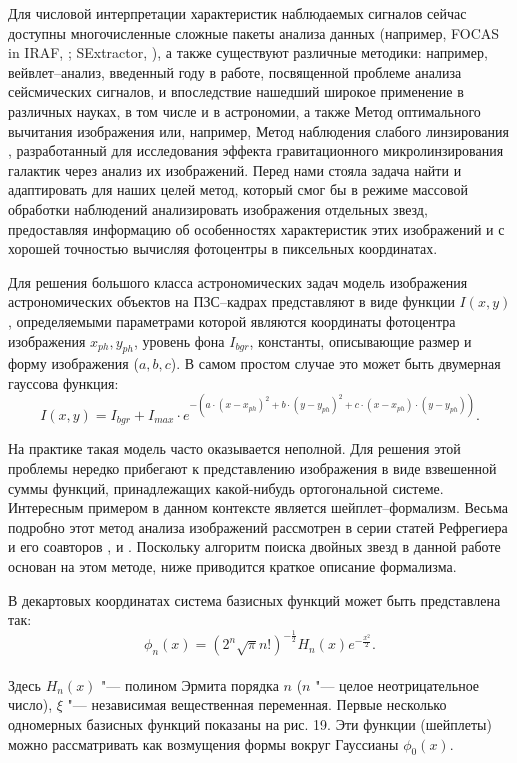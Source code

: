 Для числовой интерпретации характеристик наблюдаемых сигналов сейчас  доступны многочисленные сложные пакеты анализа данных (например,  FOCAS in IRAF, \cite{1981AJ.....86..476J}; SExtractor, \cite{1996A&AS..117...393B}), а также существуют различные методики: например, вейвлет--анализ, введенный  году в работе, посвященной проблеме анализа сейсмических сигналов, и впоследствие нашедший широкое применение в различных науках, в том числе и в астрономии, а также Метод оптимального вычитания изображения \cite{1998ApJ...503..325A}  или, например, Метод наблюдения слабого линзирования \cite{1995ApJ...449..460K}, разработанный для исследования эффекта гравитационного микролинзирования галактик через анализ их изображений. Перед нами стояла задача найти и адаптировать для наших целей метод, который смог бы в режиме массовой обработки наблюдений  анализировать изображения отдельных звезд, предоставляя информацию об особенностях характеристик этих изображений и с хорошей точностью вычисляя фотоцентры в пиксельных координатах.

Для решения большого класса астрономических задач модель изображения астрономических объектов на ПЗС--кадрах представляют в виде функции $I(x,y)$, определяемыми параметрами которой являются координаты фотоцентра изображения $x_{ph},y_{ph}$, уровень фона $I_{bgr}$, константы, описывающие размер и форму изображения ($a,b,c$). В самом простом случае это может быть двумерная гауссова функция:
 \begin{equation}
 \label{eq:ShI}
 I(x,y) = I_{bgr}+I_{max}\cdot e^{-(a\cdot(x-x_{ph})^2+b\cdot(y-y_{ph})^2+c\cdot(x-x_{ph})\cdot(y-y_{ph}))}.
 \end{equation}
 
На практике такая модель часто оказывается неполной. Для решения этой проблемы нередко прибегают к представлению изображения в виде взвешенной суммы функций, принадлежащих какой-нибудь ортогональной системе. Интересным примером в данном контексте является шейплет--формализм. Весьма подробно этот метод анализа изображений рассмотрен в серии статей Рефрегиера и его соавторов \cite{2003MNRAS.338...35R}, \cite{2003MNRAS.338...48R} и \cite{2005MNRAS.363..197M}. Поскольку алгоритм поиска двойных звезд в данной работе основан на этом методе, ниже приводится краткое описание формализма.

В декартовых координатах система базисных функций может быть представлена так:\\
\begin{equation}
\label{eq:ShBasis}
\phi_n(x) = \left(2^n\sqrt{\pi}n!\right)^{-\frac{1}{2}}H_n(x)e^{-\frac{x^2}{2}}.
\end{equation}
\\Здесь $H_n(x)$ "--- полином Эрмита порядка $n$ ($n$ "--- целое неотрицательное число), $\xi$ "--- независимая вещественная переменная.
Первые несколько одномерных базисных функций показаны на рис. 19. Эти функции (\glqq шейплеты\grqq) можно рассматривать как возмущения формы вокруг Гауссианы $\phi_0(x)$.

